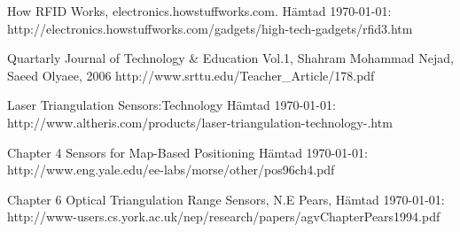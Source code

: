 \documentclass[a4paper,12pt,fleqn]{article}
\begin{document}
How RFID Works, electronics.howstuffworks.com. Hämtad \today:\newline
http://electronics.howstuffworks.com/gadgets/high-tech-gadgets/rfid3.htm

Quartarly Journal of Technology & Education Vol.1, 
Shahram Mohammad Nejad, Saeed Olyaee, 2006
http://www.srttu.edu/Teacher_Article/178.pdf

Laser Triangulation Sensors:Technology Hämtad \today:\newline
http://www.altheris.com/products/laser-triangulation-technology-.htm

Chapter 4 Sensors for Map-Based Positioning Hämtad \today:\newline
http://www.eng.yale.edu/ee-labs/morse/other/pos96ch4.pdf

Chapter 6 Optical Triangulation Range Sensors, N.E Pears, Hämtad \today:\newline 
http://www-users.cs.york.ac.uk/nep/research/papers/agvChapterPears1994.pdf
\end{document}
